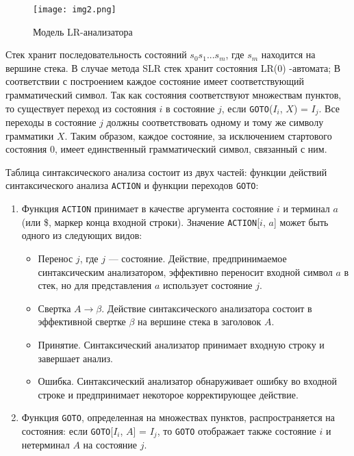 \documentclass[bachelor, och, coursework, times]{SCWorks}
\begin{document}
\begin{figure} [!ht]
	\centering
	\texttt{[image: img2.png]}
	\caption{Модель LR-анализатора}
	\label{ris:image2}
\end{figure}

Стек хранит последовательность состояний $s_0s_1...s_m$, где $s_m$ находится на вершине стека. В случае метода SLR стек хранит состояния LR(0) -автомата; В соответствии с построением каждое состояние имеет соответствующий грамматический символ. Так как состояния соответствуют множествам пунктов, то существует переход из состояния $i$ в состояние $j$, если \verb|GOTO|($I_i$, $X$) = $I_j$. Все переходы в состояние $j$ должны соответствовать одному и тому же символу грамматики $X$. Таким  образом, каждое состояние, за исключением стартового состояния 0, имеет единственный грамматический символ, связанный с ним.~\cite{Kluch}

Таблица синтаксического анализа состоит из двух частей: функции действий синтаксического анализа \verb|ACTION| и функции переходов \verb|GOTO|:
\begin{enumerate}
	\item Функция \verb|ACTION| принимает в качестве аргумента состояние $i$ и терминал	$a$ (или \$, маркер конца входной строки). Значение \verb|ACTION|[$i$, $a$] может быть 
	одного из следующих видов:
	\begin{itemize}
		\item Перенос $j$, где $j$ --- состояние. Действие, предпринимаемое синтаксическим анализатором, эффективно переносит входной символ $a$ в стек, но для представления $a$ использует состояние $j$. 
		\item Свертка $A \to \beta$. Действие синтаксического анализатора состоит в эффективной свертке $\beta$ на вершине стека в заголовок $A$.
		\item Принятие. Синтаксический анализатор принимает входную строку и завершает анализ. 
		\item Ошибка. Синтаксический анализатор обнаруживает ошибку во входной строке и предпринимает некоторое корректирующее действие.
	\end{itemize}
	\item Функция \verb|GOTO|, определенная на множествах пунктов, распространяется на состояния: если \verb|GOTO|[$I_i$, $A$] = $I_j$, то \verb|GOTO| отображает также состояние $i$ и нетерминал $A$ на состояние $j$. 
\end{enumerate}
\end{document}
